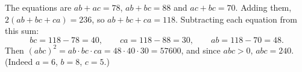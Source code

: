 The equations are $ab+ac=78$, $ab+bc=88$ and $ac+bc=70$. Adding them, $2(ab+bc+ca)=236$, so $ab+bc+ca=118$. Subtracting each equation from this sum:
\[
bc=118-78=40,\qquad ca=118-88=30,\qquad ab=118-70=48 .
\]
Then $(abc)^2=ab\cdot bc\cdot ca=48\cdot40\cdot30=57600$, and since $abc>0$, $abc=\boxed{240}$. (Indeed $a=6$, $b=8$, $c=5$.)
